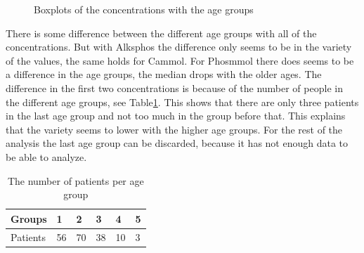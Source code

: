 \documentclass{article}
\begin{document}
\begin{figure}
          \caption{Boxplots of the concentrations with the age groups}
          \label{fig:BoxAgegrp}
      \end{figure}

      There is some difference between the different age groups with all of the concentrations.
      But with Alksphos the difference only seems to be in the variety of the values, the same holds for Cammol.
      For Phosmmol there does seems to be a difference in the age groups, the median drops with the older ages.
      The difference in the first two concentrations is because of the number of people in the different age groups, see Table\ref{table:Agegrp}.
      This shows that there are only three patients in the last age group and not too much in the group before that.
      This explains that the variety seems to lower with the higher age groups.
      For the rest of the analysis the last age group can be discarded, because it has not enough data to be able to analyze.
      
      \begin{table}
        \begin{center}
          \begin{tabular}{|l|lllll|}
          \hline
          Groups&1&2&3&4&5\\
          \hline
          Patients&56&70&38&10&3\\
          \hline
          \end{tabular}
        \end{center}
        \caption{The number of patients per age group}
        \label{table:Agegrp}
      \end{table}
\end{document}
